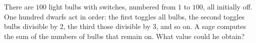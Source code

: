 There are $100$ light bulbs with switches, numbered from $1$ to $100$, all initially off. One hundred dwarfs act in order: the first toggles all bulbs, the second toggles bulbs divisible by $2$, the third those divisible by $3$, and so on. A sage computes the sum of the numbers of bulbs that remain on. What value could he obtain?
